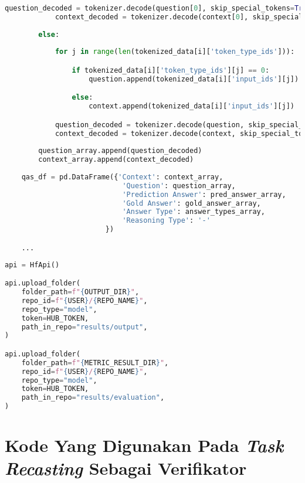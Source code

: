 \begin{lstlisting}[language=Python, caption=Representasi prediksi jawaban untuk evaluasi dan analisis]
            question_decoded = tokenizer.decode(question[0], skip_special_tokens=True)
            context_decoded = tokenizer.decode(context[0], skip_special_tokens=True)
            
        else:
            
            for j in range(len(tokenized_data[i]['token_type_ids'])):

                if tokenized_data[i]['token_type_ids'][j] == 0:
                    question.append(tokenized_data[i]['input_ids'][j])

                else:
                    context.append(tokenized_data[i]['input_ids'][j])

            question_decoded = tokenizer.decode(question, skip_special_tokens=True)
            context_decoded = tokenizer.decode(context, skip_special_tokens=True)
        
        question_array.append(question_decoded)
        context_array.append(context_decoded)
        
    qas_df = pd.DataFrame({'Context': context_array, 
                            'Question': question_array, 
                            'Prediction Answer': pred_answer_array,
                            'Gold Answer': gold_answer_array,
                            'Answer Type': answer_types_array,
                            'Reasoning Type': '-'
                        })

    ...
\end{lstlisting}

\begin{lstlisting}[language=Python, caption=Melakukan \emph{push} ke akun Hugging Face]
api = HfApi()

api.upload_folder(
    folder_path=f"{OUTPUT_DIR}",
    repo_id=f"{USER}/{REPO_NAME}",
    repo_type="model",
    token=HUB_TOKEN,
    path_in_repo="results/output",
)

api.upload_folder(
    folder_path=f"{METRIC_RESULT_DIR}",
    repo_id=f"{USER}/{REPO_NAME}",
    repo_type="model",
    token=HUB_TOKEN,
    path_in_repo="results/evaluation",
)
\end{lstlisting}

\section*{Kode Yang Digunakan Pada \emph{Task Recasting} Sebagai Verifikator}

